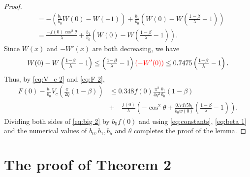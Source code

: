 \documentclass[10pt]{amsart}
\theoremstyle{remark}
\theoremstyle{plain}
\numberwithin{equation}{section}
\theoremstyle{definition}
\def\({\left(}
\def\){\right)}
\def\lam{\lambda}
\newcommand{\rev}[1]{{\color{red}#1}}
\begin{document}
\begin{proof}
\begin{equation}
\begin{split}
&= - \( \frac{b_1}{b_0}W(0)-W(-1) \) + \frac{b_1}{b_0} \( W(0) - 
W\( \tfrac{1-\beta}{\lam}-1\) \) \\
&= \frac{-f(0)\cos^2\theta}{\lam}  + \frac{b_1}{b_0} \( W(0) - 
W\( \tfrac{1-\beta}{\lam}-1\) \).
\end{split}
\label{eq:F 2}
\end{equation}
Since $W(x)$ and \rev{$-W'(x)$} are both decreasing, we have
$$
W(0) - W\( \tfrac{1-\beta}{\lam}-1\) \le \( \tfrac{1-\beta}{\lam}-1\)\rev{(- W'(0))}
\le 0.7475 \( \tfrac{1-\beta}{\lam}-1\). 
$$
Thus, by \eqref{eq:V_c 2} and \eqref{eq:F 2},
\begin{equation}
\begin{split}
F(0)-\frac{b_1}{b_0} V_c\( \tfrac{\pi}{2\eta}(1-\beta) \) &\le
0.348 f(0) \frac{\pi^2}{4\eta^2} \frac{b_1}{b_0} (1-\beta) \\
&+ \quad \frac{f(0)}{\lam} \( -\cos^2 \theta
+ \frac{0.7475b_1}{b_0 w(0)} \( \tfrac{1-\beta}{\lam}-1\) \).
\end{split}
\label{eq:beta 1}
\end{equation}
Dividing both sides of \eqref{eq:big 2} by $b_0 f(0)$ and using
\eqref{eq:constants}, \eqref{eq:beta 1} and the numerical values of
$b_0,b_1,b_5$ and $\theta$ completes the proof of the lemma.
\end{proof}


%
%
\section{The proof of Theorem 2}\label{sec:thm2}
%
%
%
\end{document}
